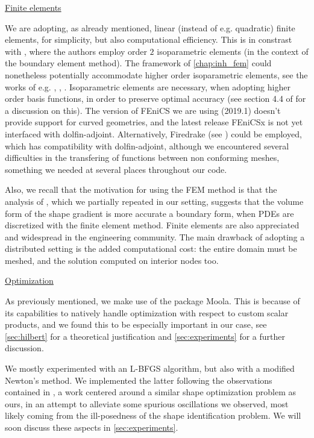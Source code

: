 \documentclass[english,a4paper,10pt,oneside]{scrbook}	%
\theoremstyle{break}
\theoremstyle{remark}
\begin{document}
\underline{Finite elements}

We are adopting, as already mentioned, linear (instead of e.g. quadratic) finite elements, for simplicity, but also computational efficiency. This is in constrast with \cite{harbrecht}, where the authors employ order $2$ isoparametric elements (in the context of the boundary element method). The framework of \cref{chap:inh_fem} could nonetheless potentially accommodate higher order isoparametric elements, see the works of e.g. \cite{edelmann}, \cite{elliott}, \cite{ranner}. Isoparametric elements are necessary, when adopting higher order basis functions, in order to preserve optimal accuracy (see section 4.4 of \cite{strang} for a discussion on this). The version of FEniCS we are using (2019.1) doesn't provide support for curved geometries, and the latest release FEniCSx is not yet interfaced with dolfin-adjoint. Alternatively, Firedrake (see \cite{firedrake}) could be employed, which has compatibility with dolfin-adjoint, although we encountered several difficulties in the transfering of functions between non conforming meshes, something we needed at several places throughout our code.

Also, we recall that the motivation for using the FEM method is that the analysis of \cite{paganini}, which we partially repeated in our setting, suggests that the volume form of the shape gradient is more accurate a boundary form, when PDEs are discretized with the finite element method. Finite elements are also appreciated and widespread in the engineering community.
The main drawback of adopting a distributed setting is the added computational cost: the entire domain must be meshed, and the solution computed on interior nodes too.

\underline{Optimization}

As previously mentioned, we make use of the package Moola. This is because of its capabilities to natively handle optimization with respect to custom scalar products, and we found this to be especially important in our case, see \cref{sec:hilbert} for a theoretical justification and \cref{sec:experiments} for a further discussion.

We mostly experimented with an L-BFGS algorithm, but also with a modified Newton's method. We implemented the latter following the observations contained in \cite{eppler}, a work centered around a similar shape optimization problem as ours, in an attempt to alleviate some spurious oscillations we observed, most likely coming from the ill-posedness of the shape identification problem. We will soon discuss these aspects in \cref{sec:experiments}.
\end{document}
